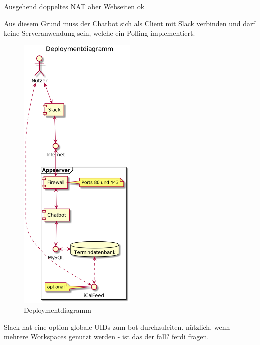 Ausgehend  doppeltes NAT aber Webseiten ok

Aus diesem Grund muss der Chatbot sich als Client mit Slack verbinden und darf keine Serveranwendung sein, welche ein Polling implementiert.

\begin{figure}[htbp]
    \centering
    \includegraphics[width=0.5\textwidth]{../docs/uml/architecture.png}
    \caption{Deploymentdiagramm}
    \label{img:deployment}
\end{figure}


Slack hat eine option globale UIDs zum bot durchzuleiten. nützlich, wenn mehrere Workspaces genutzt werden - ist das der fall? ferdi fragen.
